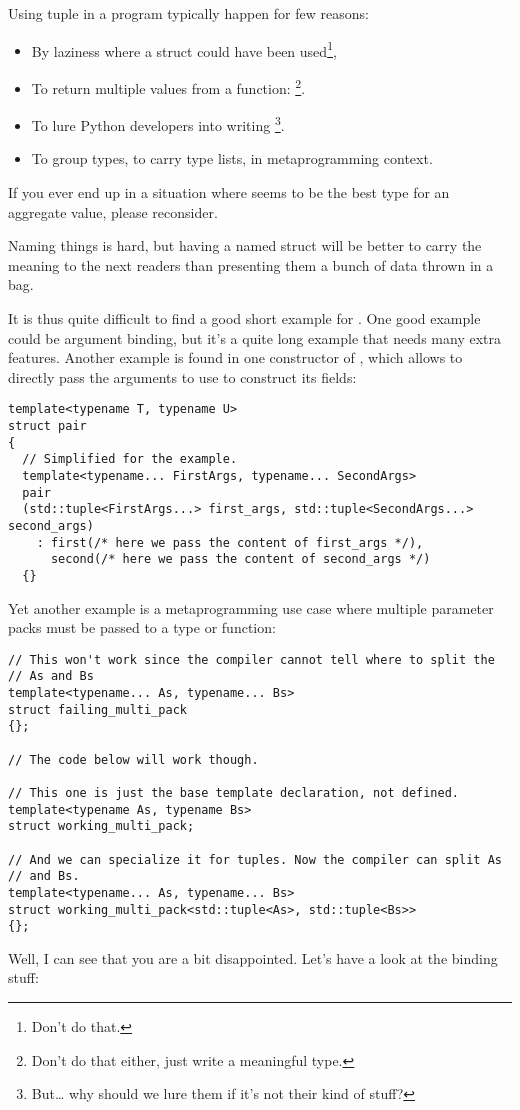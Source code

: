 Using tuple in a \cpp{} program typically happen for few reasons:
\begin{itemize}
\item By laziness where a struct could have been used\footnote{Don't
  do that.},
\item To return multiple values from a function:
  \footnote{Don't do
    that either, just write a meaningful type.}.
\item To lure Python developers into writing \cpp{}\footnote{But… why
  should we lure them if it's not their kind of stuff?}.
\item To group types, to carry type lists, in metaprogramming context.
\end{itemize}

\begin{guideline}
If you ever end up in a situation where  seems to be
the best type for an aggregate value, please reconsider.

Naming things is hard, but having a named struct will be better to
carry the meaning to the next readers than presenting them a bunch of
data thrown in a bag.
\end{guideline}

It is thus quite difficult to find a good short example for
. One good example could be argument binding, but
it's a quite long example that needs many extra features. Another
example is found in one constructor of , which allows
to directly pass the arguments to use to construct its fields:

\begin{lstlisting}
template<typename T, typename U>
struct pair
{
  // Simplified for the example.
  template<typename... FirstArgs, typename... SecondArgs>
  pair
  (std::tuple<FirstArgs...> first_args, std::tuple<SecondArgs...> second_args)
    : first(/* here we pass the content of first_args */),
      second(/* here we pass the content of second_args */)
  {}
\end{lstlisting}

Yet another example is a metaprogramming use case where multiple
parameter packs must be passed to a type or function:

\begin{lstlisting}
// This won't work since the compiler cannot tell where to split the
// As and Bs
template<typename... As, typename... Bs>
struct failing_multi_pack
{};

// The code below will work though.

// This one is just the base template declaration, not defined.
template<typename As, typename Bs>
struct working_multi_pack;

// And we can specialize it for tuples. Now the compiler can split As
// and Bs.
template<typename... As, typename... Bs>
struct working_multi_pack<std::tuple<As>, std::tuple<Bs>>
{};
\end{lstlisting}

Well, I can see that you are a bit disappointed. Let's have a look at
the binding stuff:




